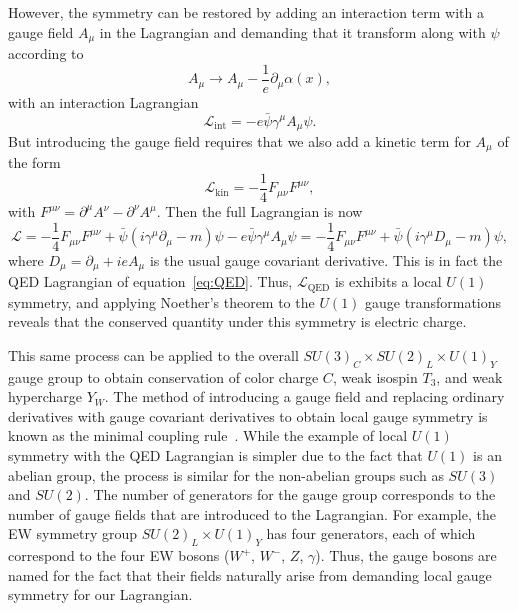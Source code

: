 However, the symmetry can be restored by adding an interaction term with a gauge field $A_\mu$ in the Lagrangian and demanding that it transform along with $\psi$ according to
\begin{equation}
  A_\mu\to A_\mu-\frac{1}{e}\partial_\mu\alpha(x),
\end{equation}
with an interaction Lagrangian
\begin{equation}
  \mathcal{L}_\mathrm{int}=-e\bar{\psi}\gamma^\mu A_\mu\psi.
\end{equation}
But introducing the gauge field requires that we also add a kinetic term for $A_\mu$ of the form
\begin{equation}
  \mathcal{L}_\mathrm{kin}=-\frac{1}{4}F_{\mu\nu}F^{\mu\nu},
\end{equation}
with $F^{\mu\nu}=\partial^\mu A^\nu-\partial^\nu A^\mu$.
Then the full Lagrangian is now
\begin{equation}
  \mathcal{L}=-\frac{1}{4}F_{\mu\nu}F^{\mu\nu}+\bar{\psi}(i\gamma^\mu\partial_\mu-m)\psi-e\bar{\psi}\gamma^\mu A_\mu\psi=-\frac{1}{4}F_{\mu\nu}F^{\mu\nu}+\bar{\psi}(i\gamma^\mu D_\mu-m)\psi,
\end{equation}
where $D_\mu=\partial_\mu+ieA_\mu$ is the usual gauge covariant derivative.
This is in fact the QED Lagrangian of equation~\ref{eq:QED}.
Thus, $\mathcal{L}_\mathrm{QED}$ is exhibits a local $U(1)$ symmetry, and applying Noether's theorem to the $U(1)$ gauge transformations reveals that the conserved quantity under this symmetry is electric charge.

This same process can be applied to the overall $SU(3)_C\times SU(2)_L\times U(1)_Y$ gauge group to obtain conservation of color charge $C$, weak isospin $T_3$, and weak hypercharge $Y_W$.
The method of introducing a gauge field and replacing ordinary derivatives with gauge covariant derivatives to obtain local gauge symmetry is known as the minimal coupling rule~\cite{cheng1984}.
While the example of local $U(1)$ symmetry with the QED Lagrangian is simpler due to the fact that $U(1)$ is an abelian group, the process is similar for the non-abelian groups such as $SU(3)$ and $SU(2)$.
The number of generators for the gauge group corresponds to the number of gauge fields that are introduced to the Lagrangian.
For example, the EW symmetry group $SU(2)_L\times U(1)_Y$ has four generators, each of which correspond to the four EW bosons ($W^+$, $W^-$, $Z$, $\gamma$).
Thus, the gauge bosons are named for the fact that their fields naturally arise from demanding local gauge symmetry for our Lagrangian.

